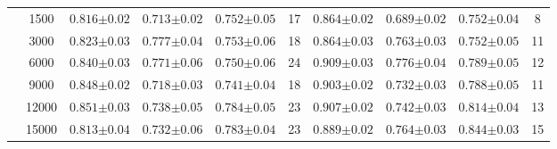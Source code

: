 \begin{table}[hbtp]
\begin{tabularx}{\textwidth}{cc | YYYc | YYYc }
        & 1500 & $0.816{\scriptscriptstyle\pm0.02}$ & $0.713{\scriptscriptstyle\pm0.02}$ & $0.752{\scriptscriptstyle\pm0.05}$ & 17 & $0.864{\scriptscriptstyle\pm0.02}$ & $0.689{\scriptscriptstyle\pm0.02}$ & $0.752{\scriptscriptstyle\pm0.04}$ & 8 \\
        & 3000 & $0.823{\scriptscriptstyle\pm0.03}$ & $0.777{\scriptscriptstyle\pm0.04}$ & $0.753{\scriptscriptstyle\pm0.06}$ & 18 & $0.864{\scriptscriptstyle\pm0.03}$ & $0.763{\scriptscriptstyle\pm0.03}$ & $0.752{\scriptscriptstyle\pm0.05}$ & 11 \\
        & 6000 & $0.840{\scriptscriptstyle\pm0.03}$ & $0.771{\scriptscriptstyle\pm0.06}$ & $0.750{\scriptscriptstyle\pm0.06}$ & 24 & $0.909{\scriptscriptstyle\pm0.03}$ & $0.776{\scriptscriptstyle\pm0.04}$ & $0.789{\scriptscriptstyle\pm0.05}$ & 12 \\
        & 9000 & $0.848{\scriptscriptstyle\pm0.02}$ & $0.718{\scriptscriptstyle\pm0.03}$ & $0.741{\scriptscriptstyle\pm0.04}$ & 18 & $0.903{\scriptscriptstyle\pm0.02}$ & $0.732{\scriptscriptstyle\pm0.03}$ & $0.788{\scriptscriptstyle\pm0.05}$ & 11 \\
        & 12000 & $0.851{\scriptscriptstyle\pm0.03}$ & $0.738{\scriptscriptstyle\pm0.05}$ & $0.784{\scriptscriptstyle\pm0.05}$ & 23 & $0.907{\scriptscriptstyle\pm0.02}$ & $0.742{\scriptscriptstyle\pm0.03}$ & $0.814{\scriptscriptstyle\pm0.04}$ & 13 \\
        & 15000 & $0.813{\scriptscriptstyle\pm0.04}$ & $0.732{\scriptscriptstyle\pm0.06}$ & $0.783{\scriptscriptstyle\pm0.04}$ & 23 & $0.889{\scriptscriptstyle\pm0.02}$ & $0.764{\scriptscriptstyle\pm0.03}$ & $0.844{\scriptscriptstyle\pm0.03}$ & 15 \\
        

\end{tabularx}
\end{table}
